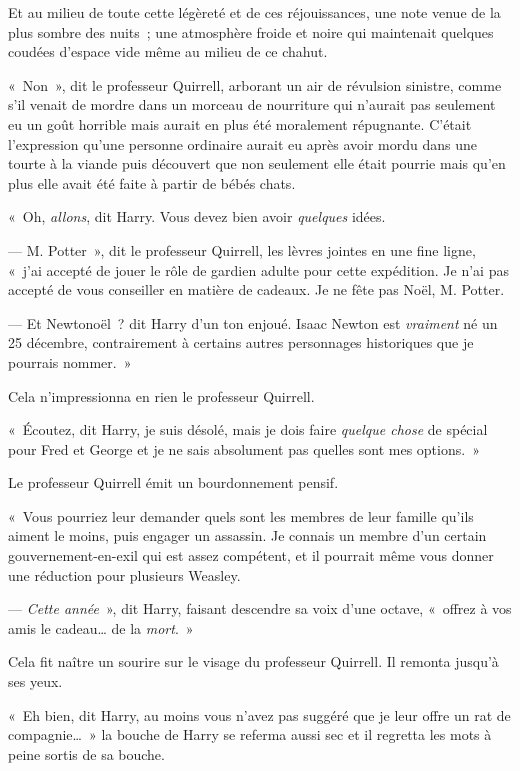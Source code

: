 Et au milieu de toute cette légèreté et de ces réjouissances, une note venue de la plus sombre des nuits~; une atmosphère froide et noire qui maintenait quelques coudées d'espace vide même au milieu de ce chahut.

«~Non~», dit le professeur Quirrell, arborant un air de révulsion sinistre, comme s'il venait de mordre dans un morceau de nourriture qui n'aurait pas seulement eu un goût horrible mais aurait en plus été moralement répugnante.
C'était l'expression qu'une personne ordinaire aurait eu après avoir mordu dans une tourte à la viande puis découvert que non seulement elle était pourrie mais qu'en plus elle avait été faite à partir de bébés chats.

«~Oh, \emph{allons}, dit Harry.
Vous devez bien avoir \emph{quelques} idées.

--- M. Potter~», dit le professeur Quirrell, les lèvres jointes en une fine ligne, «~j'ai accepté de jouer le rôle de gardien adulte pour cette expédition.
Je n'ai pas accepté de vous conseiller en matière de cadeaux.
Je ne fête pas Noël, M. Potter.

--- Et Newtonoël~? dit Harry d'un ton enjoué.
Isaac Newton est \emph{vraiment} né un 25 décembre, contrairement à certains autres personnages historiques que je pourrais nommer.~»

Cela n'impressionna en rien le professeur Quirrell.

«~Écoutez, dit Harry, je suis désolé, mais je dois faire \emph{quelque chose} de spécial pour Fred et George et je ne sais absolument pas quelles sont mes options.~»

Le professeur Quirrell émit un bourdonnement pensif.

«~Vous pourriez leur demander quels sont les membres de leur famille qu'ils aiment le moins, puis engager un assassin.
Je connais un membre d'un certain gouvernement-en-exil qui est assez compétent, et il pourrait même vous donner une réduction pour plusieurs Weasley.

--- \emph{Cette année}~», dit Harry, faisant descendre sa voix d'une octave, «~offrez à vos amis le cadeau… de la \emph{mort}.~»

Cela fit naître un sourire sur le visage du professeur Quirrell.
Il remonta jusqu'à ses yeux.

«~Eh bien, dit Harry, au moins vous n'avez pas suggéré que je leur offre un rat de compagnie…~»
la bouche de Harry se referma aussi sec et il regretta les mots à peine sortis de sa bouche.

